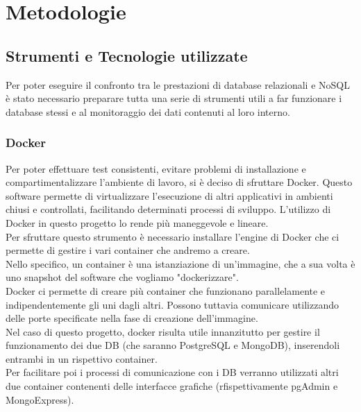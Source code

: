 
\chapter{Metodologie}
\label{cap:metodologie}


\section{Strumenti e Tecnologie utilizzate}
Per poter eseguire il confronto tra le prestazioni di database relazionali e NoSQL è stato necessario preparare tutta una serie di strumenti utili a far funzionare i database stessi e al monitoraggio dei dati contenuti al loro interno.

\subsection{Docker}
Per poter effettuare test consistenti, evitare problemi di installazione e compartimentalizzare l'ambiente di lavoro, si è deciso di sfruttare Docker. Questo software permette di virtualizzare l'esecuzione di altri applicativi in ambienti chiusi e controllati, facilitando determinati processi di sviluppo. L'utilizzo di Docker in questo progetto lo rende più maneggevole e lineare.\\
Per sfruttare questo strumento è necessario installare l'engine di Docker che ci permette di gestire i vari container che andremo a creare.\\
Nello specifico, un container è una istanziazione di un'immagine, che a sua volta è uno snapshot del software che vogliamo "dockerizzare".\\
Docker ci permette di creare più container che funzionano parallelamente e indipendentemente gli uni dagli altri. Possono tuttavia comunicare utilizzando delle porte specificate nella fase di creazione dell'immagine.\\

\noindent Nel caso di questo progetto, docker risulta utile innanzitutto per gestire il funzionamento dei due DB (che saranno PostgreSQL e MongoDB), inserendoli entrambi in un rispettivo container.\\
Per facilitare poi i processi di comunicazione con i DB verranno utilizzati altri due container contenenti delle interfacce grafiche (rfispettivamente pgAdmin e MongoExpress).

